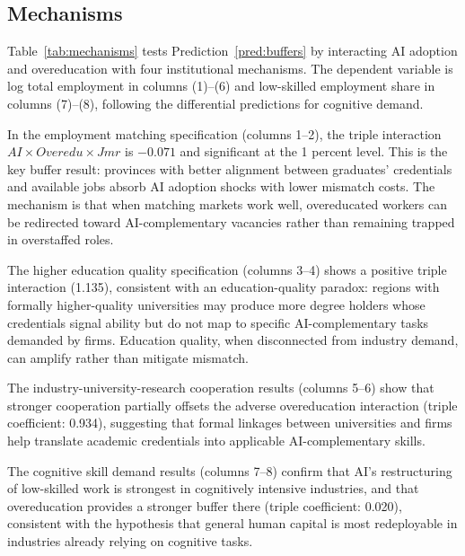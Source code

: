 \documentclass[12pt,a4paper]{article}
\theoremstyle{predstyle}
\theoremstyle{plain}
\newcommand{\Overedu}{\mathit{Overedu}}
\newcommand{\Jmr}{\mathit{Jmr}}
\begin{document}
\subsection{Mechanisms}

Table~\ref{tab:mechanisms} tests Prediction~\ref{pred:buffers} by interacting AI adoption and overeducation with four institutional mechanisms. The dependent variable is log total employment in columns (1)--(6) and low-skilled employment share in columns (7)--(8), following the differential predictions for cognitive demand.

In the employment matching specification (columns 1--2), the triple interaction \(AI \times \Overedu \times \Jmr\) is \(-0.071\) and significant at the 1 percent level. This is the key buffer result: provinces with better alignment between graduates' credentials and available jobs absorb AI adoption shocks with lower mismatch costs. The mechanism is that when matching markets work well, overeducated workers can be redirected toward AI-complementary vacancies rather than remaining trapped in overstaffed roles.

The higher education quality specification (columns 3--4) shows a positive triple interaction (1.135), consistent with an education-quality paradox: regions with formally higher-quality universities may produce more degree holders whose credentials signal ability but do not map to specific AI-complementary tasks demanded by firms. Education quality, when disconnected from industry demand, can amplify rather than mitigate mismatch.

The industry-university-research cooperation results (columns 5--6) show that stronger cooperation partially offsets the adverse overeducation interaction (triple coefficient: 0.934), suggesting that formal linkages between universities and firms help translate academic credentials into applicable AI-complementary skills.

The cognitive skill demand results (columns 7--8) confirm that AI's restructuring of low-skilled work is strongest in cognitively intensive industries, and that overeducation provides a stronger buffer there (triple coefficient: 0.020), consistent with the hypothesis that general human capital is most redeployable in industries already relying on cognitive tasks.
\end{document}
